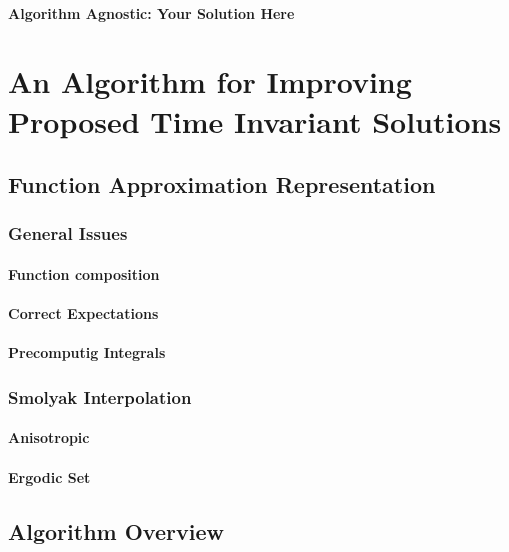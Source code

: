 \documentclass[12pt]{article}
\begin{document}
\paragraph{Algorithm Agnostic: Your Solution Here}

\section{An Algorithm for Improving Proposed Time Invariant Solutions}
\label{sec:algoforsoln}

\subsection{Function Approximation Representation}
\label{sec:funcApproxRep}

\subsubsection{General Issues}
\label{sec:generalissues}

\paragraph{Function composition}



\paragraph{Correct Expectations}

\paragraph{Precomputig Integrals}


\subsubsection{Smolyak Interpolation}
\label{sec:smolyakinterp}

\paragraph{Anisotropic}

\paragraph{Ergodic Set}

\subsection{Algorithm Overview}
\label{sec:algoverview}
\end{document}
